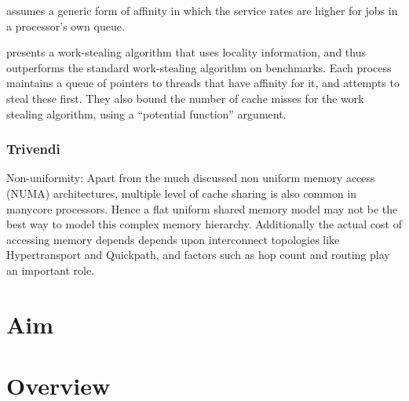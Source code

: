 \cite{Squillante2001} assumes a generic form of affinity in which the
service rates are higher for jobs in a processor's own queue.

\cite{Acar2002} presents a work-stealing algorithm that uses locality
information, and thus outperforms the standard work-stealing algorithm
on benchmarks. Each process maintains a queue of pointers to threads
that have affinity for it, and attempts to steal these first. They
also bound the number of cache misses for the work stealing algorithm,
using a ``potential function'' argument.

\subsubsection{Trivendi}

Non-uniformity: Apart from the much discussed non uniform memory
access (NUMA) architectures, multiple level of cache sharing is also
common in manycore processors. Hence a flat uniform shared memory
model may not be the best way to model this complex memory hierarchy.
Additionally the actual cost of accessing memory depends depends upon
interconnect topologies like Hypertransport and Quickpath, and factors
such as hop count and routing play an important role.


\section{Aim}
\label{sec:locality-intro-aim}


\section{Overview}
\label{sec:locality-intro-overview}



